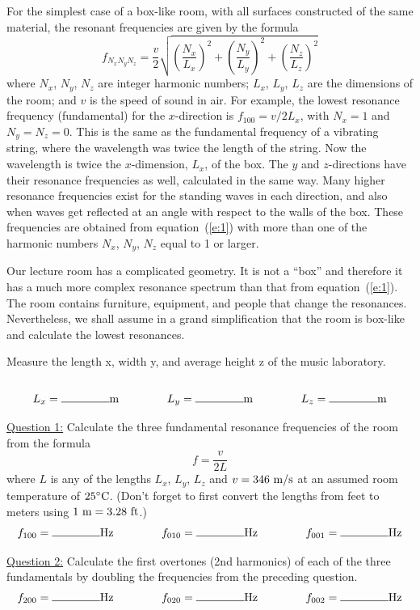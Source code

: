 \documentclass[11pt]{NSF}
\def\be{\begin{equation}}
\def\ee{\end{equation}}
\begin{document}
For the simplest case of a box-like room, with all surfaces constructed 
of the same material, the resonant frequencies are given by the formula
%
\be
f_{N_xN_yN_z} = \frac{v}{2}\sqrt{
\left(\frac{N_x}{L_x}\right)^2+
\left(\frac{N_y}{L_y}\right)^2+
\left(\frac{N_z}{L_z}\right)^2}
\label{e:1}
\ee
%
where $N_x$, $N_y$, $N_z$ are integer harmonic numbers; $L_x$, $L_y$,
$L_z$ are the dimensions of the room; and $v$ is the speed of sound in
air. For example, the lowest resonance frequency (fundamental) for the
$x$-direction is $f_{100} = v/2L_x$, with $N_x=1$ and $N_y=N_z=0$.
This is the same as the fundamental frequency of a vibrating
string, where the wavelength was twice the length of the string. Now
the wavelength is twice the $x$-dimension, $L_x$, of the box.  The $y$
and $z$-directions have their resonance frequencies as well,
calculated in the same way. Many higher resonance frequencies exist
for the standing waves in each direction, and also when waves get
reflected at an angle with respect to the walls of the box. These
frequencies are obtained from equation~(\ref{e:1}) with more than one of
the harmonic numbers $N_x$, $N_y$, $N_z$ equal to 1 or larger.

Our lecture room has a complicated geometry. It is not a ``box” 
and therefore it has a much more complex resonance spectrum than that from
equation~(\ref{e:1}). The room contains furniture, equipment, and people that
change the resonances. Nevertheless, we shall assume in a grand
simplification that the room is box-like and calculate the lowest
resonances.  

Measure the length x, width y, and average height z of the music laboratory. \\ \\
\[L_x = \rule{1.5cm}{0.15mm}{\rm m}  \rule{1.5cm}{0.0mm}  
L_y = \rule{1.5cm}{0.15mm}{\rm m} \rule{1.5cm}{0.0mm}  
L_z = \rule{1.5cm}{0.15mm}{\rm m}\]

\underline{Question 1:}  Calculate the three fundamental resonance frequencies of the room
from the formula
%
\be
f= \frac{v}{2L}
\ee
%
where $L$ is any of the lengths $L_x$, $L_y$, $L_z$ and $v = 346~{\rm
m/s}$ at an assumed room temperature of $25{}^\circ{\rm C}$.
(Don't forget to first convert the lengths from feet to meters using
$1~{\rm m}= 3.28~{\rm ft}$.)
\[f_{100} = \rule{1.5cm}{0.15mm}{\rm Hz}  \rule{1.5cm}{0.0mm}  
f_{010} = \rule{1.5cm}{0.15mm}{\rm Hz} \rule{1.5cm}{0.0mm}  
f_{001} = \rule{1.5cm}{0.15mm}{\rm Hz}\]

\underline{Question 2:}  Calculate the first overtones (2nd harmonics) of each of the three
fundamentals by doubling the frequencies from the preceding question.
\[f_{200} = \rule{1.5cm}{0.15mm}{\rm Hz}  \rule{1.5cm}{0.0mm}  
f_{020} = \rule{1.5cm}{0.15mm}{\rm Hz} \rule{1.5cm}{0.0mm}  
f_{002} = \rule{1.5cm}{0.15mm}{\rm Hz}\]
\end{document}
